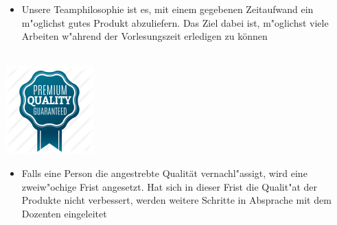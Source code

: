 \documentclass[12pt]{article}
\begin{document}
\begin{itemize}
\item Unsere Teamphilosophie ist es, mit einem gegebenen Zeitaufwand ein m"oglichst gutes Produkt abzuliefern. Das Ziel dabei ist, m"oglichst viele Arbeiten w"ahrend der Vorlesungszeit erledigen zu können\\\\
\end{itemize}

\begin{center}
\includegraphics[scale=0.7]{quality}\\
\end{center}

\begin{itemize}
\item Falls eine Person die angestrebte Qualität vernachl"assigt, wird eine zweiw"ochige Frist angesetzt. Hat sich in dieser Frist die Qualit"at der Produkte nicht verbessert, werden weitere Schritte in Absprache mit dem Dozenten eingeleitet\\\\
\end{itemize}
\end{document}
